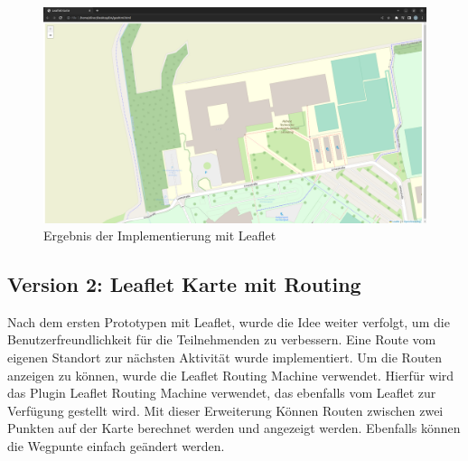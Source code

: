 \begin{figure}[h]
\centering
\includegraphics[scale=0.2]{pics/leafletmap.png}
\caption{Ergebnis der Implementierung mit Leaflet}
\end{figure}


\subsection{Version 2: Leaflet Karte mit Routing}
Nach dem ersten Prototypen mit Leaflet, wurde die Idee weiter verfolgt, um die Benutzerfreundlichkeit für die Teilnehmenden zu verbessern. Eine Route vom eigenen Standort zur nächsten Aktivität wurde implementiert. Um die Routen anzeigen zu können, wurde die Leaflet Routing Machine verwendet. 
Hierfür wird das Plugin Leaflet Routing Machine verwendet, das ebenfalls vom Leaflet zur Verfügung gestellt wird. Mit dieser Erweiterung Können Routen zwischen zwei Punkten auf der Karte berechnet werden und angezeigt werden. Ebenfalls können die Wegpunte einfach geändert werden.

